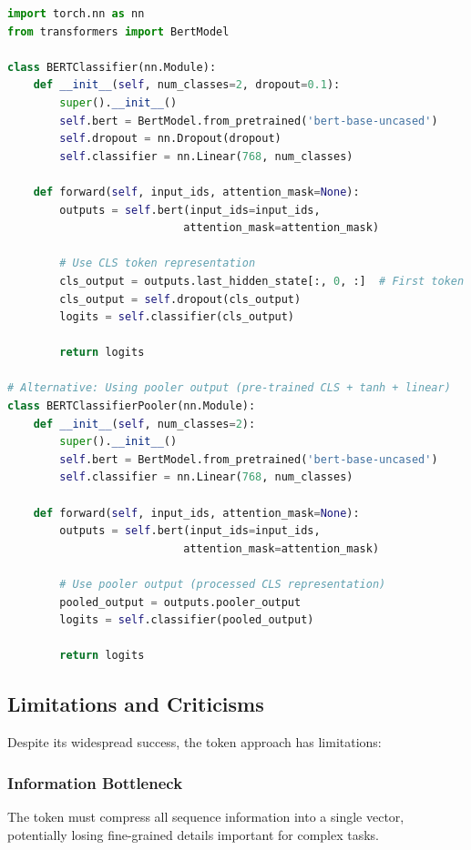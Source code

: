 \begin{lstlisting}[language=Python, caption=Fine-tuning CLS Token]
import torch.nn as nn
from transformers import BertModel

class BERTClassifier(nn.Module):
    def __init__(self, num_classes=2, dropout=0.1):
        super().__init__()
        self.bert = BertModel.from_pretrained('bert-base-uncased')
        self.dropout = nn.Dropout(dropout)
        self.classifier = nn.Linear(768, num_classes)
        
    def forward(self, input_ids, attention_mask=None):
        outputs = self.bert(input_ids=input_ids, 
                           attention_mask=attention_mask)
        
        # Use CLS token representation
        cls_output = outputs.last_hidden_state[:, 0, :]  # First token
        cls_output = self.dropout(cls_output)
        logits = self.classifier(cls_output)
        
        return logits

# Alternative: Using pooler output (pre-trained CLS + tanh + linear)
class BERTClassifierPooler(nn.Module):
    def __init__(self, num_classes=2):
        super().__init__()
        self.bert = BertModel.from_pretrained('bert-base-uncased')
        self.classifier = nn.Linear(768, num_classes)
        
    def forward(self, input_ids, attention_mask=None):
        outputs = self.bert(input_ids=input_ids, 
                           attention_mask=attention_mask)
        
        # Use pooler output (processed CLS representation)
        pooled_output = outputs.pooler_output
        logits = self.classifier(pooled_output)
        
        return logits
\end{lstlisting}

\subsection{Limitations and Criticisms}

Despite its widespread success, the \cls{} token approach has limitations:

\subsubsection{Information Bottleneck}
The \cls{} token must compress all sequence information into a single vector, potentially losing fine-grained details important for complex tasks.

